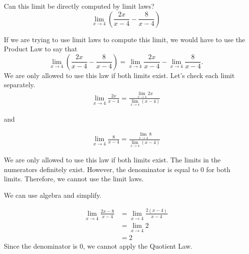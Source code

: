 \documentclass{ximera}
\begin{document}
\begin{question}
  Can this limit be directly computed by limit laws?
  \[
  \displaystyle\lim_{x\to 4}{\left(\frac{2x}{x-4}-\frac{8}{x-4}\right)}
  \]
  \begin{multipleChoice}
  \end{multipleChoice}
  \begin{feedback}
    If we are trying to use limit laws to compute this limit, we would have to use the Product Law to say that
    \[
    \displaystyle\lim_{x\to 4}\left(\frac{2x}{x-4} - \frac{8}{x-4}\right)= \displaystyle\lim_{x\to 4}\frac{2x}{x-4} - \lim_{x\to 4}\frac{8}{x-4}.
    \]
    We are only allowed to use this law if both limits exist.  Let's
    check each limit separately.
    \begin{align*}
      \displaystyle\lim_{x\to 4}\frac{2x}{x-4}=\frac{\lim_{x\to 4}2x}{\lim_{x\to 4}(x-4)}
    \end{align*}

and

    \begin{align*}
      \displaystyle\lim_{x\to 4}\frac{8}{x-4}=\displaystyle\frac{\lim_{x\to 4}8}{\lim_{x\to 4}(x-4)}
    \end{align*}
    
   We are only allowed to use this law if both limits exist. The limits in the numerators definitely
   exist. However, the denominator is equal to $0$ for both limits. Therefore, we cannot use the limit laws. 
   
   We can use algebra and simplify.
   
   \begin{align*}
   \displaystyle\lim_{x\to 4}\frac{2x-8}{x-4}&=\lim_{x\to 4}\frac{2(x-4)}{x-4}\\
   &=\lim_{x\to 4}2\\
   &=2
  \end{align*}
  Since the denominator is $0$, we cannot apply the Quotient Law.
  \end{feedback}
\end{question}
\end{document}
